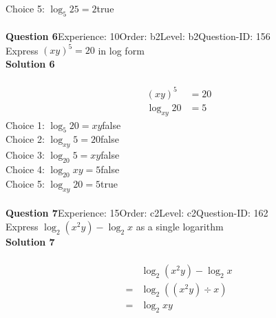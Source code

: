 \documentclass{article}
\begin{document}
Choice 5: \hspace{20pt}$\log_{5}25=2$\hspace{20pt}true\\
\\[4pt]
\noindent\textbf{Question 6}\hspace{20pt}Experience: 10\hspace{20pt}Order: b2\hspace{20pt}Level: b2\hspace{20pt}Question-ID: 156\\[2pt]
Express $(xy)^5=20$ in log form\\[4pt]
\noindent\textbf{Solution 6}\\[2pt]
\\[-35pt]\begin{align*}
(xy)^5&=20\\[2pt]
\log_{xy}20&=5
\end{align*}
Choice 1: \hspace{20pt}$\log_{5}20=xy$\hspace{20pt}false\\
Choice 2: \hspace{20pt}$\log_{xy}5=20$\hspace{20pt}false\\
Choice 3: \hspace{20pt}$\log_{20}5=xy$\hspace{20pt}false\\
Choice 4: \hspace{20pt}$\log_{20}xy=5$\hspace{20pt}false\\
Choice 5: \hspace{20pt}$\log_{xy}20=5$\hspace{20pt}true\\
\\[4pt]
\noindent\textbf{Question 7}\hspace{20pt}Experience: 15\hspace{20pt}Order: c2\hspace{20pt}Level: c2\hspace{20pt}Question-ID: 162\\[2pt]
Express $\log_{2}(x^2y)-\log_{2}x$ as a single logarithm\\[4pt]
\noindent\textbf{Solution 7}\\[2pt]
\\[-35pt]\begin{align*}
&\log_{2}(x^2y)-\log_{2}x\\[2pt]
=&\log_{2}((x^2y) \div x)\\[2pt]
=&\log_{2}xy
\end{align*}
\end{document}
